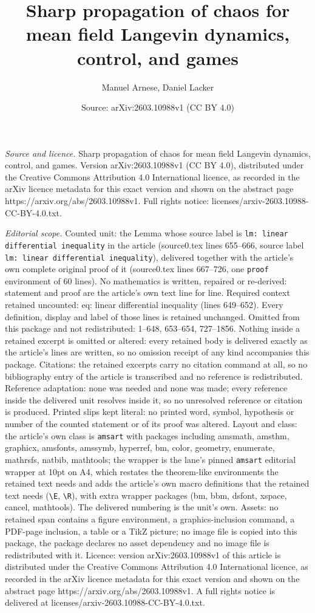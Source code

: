 \documentclass[10pt,a4paper]{amsart}
\title[Sharp propagation of chaos for mean field Langevin dynamics,]{Sharp propagation of chaos for mean field Langevin dynamics, control, and games}
\author{Manuel Arnese, Daniel Lacker}
\date{Source: arXiv:2603.10988v1 (CC BY 4.0)}
\begin{document}
\maketitle

\noindent\emph{Source and licence.} Sharp propagation of chaos for mean field Langevin dynamics, control, and games. Version arXiv:2603.10988v1 (CC BY 4.0), distributed under the Creative Commons Attribution 4.0 International licence, as recorded in the arXiv licence metadata for this exact version and shown on the abstract page https://arxiv.org/abs/2603.10988v1. Full rights notice: licenses/arxiv-2603.10988-CC-BY-4.0.txt.\par\smallskip

\noindent\textit{Editorial scope.} Counted unit: the Lemma whose source label is \texttt{lm: linear differential inequality} in the article (source0.tex lines 655--666, source label \texttt{lm: linear differential inequality}), delivered together with the article's own complete original proof of it (source0.tex lines 667--726, one \texttt{proof} environment of 60 lines). No mathematics is written, repaired or re-derived: statement and proof are the article's own text line for line. Required context retained uncounted: eq: linear differential inequality (lines 649--652). Every definition, display and label of those lines is retained unchanged. Omitted from this package and not redistributed: 1--648, 653--654, 727--1856. Nothing inside a retained excerpt is omitted or altered: every retained body is delivered exactly as the article's lines are written, so no omission receipt of any kind accompanies this package. Citations: the retained excerpts carry no citation command at all, so no bibliography entry of the article is transcribed and no reference is redistributed. Reference adaptation: none was needed and none was made; every reference inside the delivered unit resolves inside it, so no unresolved reference or citation is produced. Printed slips kept literal: no printed word, symbol, hypothesis or number of the counted statement or of its proof was altered. Layout and class: the article's own class is \texttt{amsart} with packages including amsmath, amsthm, graphicx, amsfonts, amssymb, hyperref, bm, color, geometry, enumerate, mathrsfs, natbib, mathtools; the wrapper is the lane's pinned \texttt{amsart} editorial wrapper at 10pt on A4, which restates the theorem-like environments the retained text needs and adds the article's own macro definitions that the retained text needs (\texttt{\textbackslash E}, \texttt{\textbackslash R}), with extra wrapper packages (bm, bbm, dsfont, xspace, cancel, mathtools). The delivered numbering is the unit's own. Assets: no retained span contains a figure environment, a graphics-inclusion command, a PDF-page inclusion, a table or a TikZ picture; no image file is copied into this package, the package declares no asset dependency and no image file is redistributed with it. Licence: version arXiv:2603.10988v1 of this article is distributed under the Creative Commons Attribution 4.0 International licence, as recorded in the arXiv licence metadata for this exact version and shown on the abstract page https://arxiv.org/abs/2603.10988v1. A full rights notice is delivered at licenses/arxiv-2603.10988-CC-BY-4.0.txt. 
\end{document}
